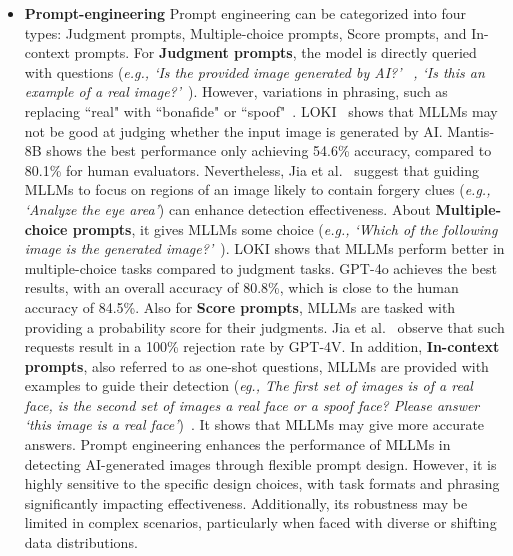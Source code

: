 \begin{itemize}
\item \textbf{Prompt-engineering}
Prompt engineering can be categorized into four types: Judgment prompts, Multiple-choice prompts, Score prompts, and In-context prompts. 
For \textbf{Judgment prompts}, the model is directly queried with questions (\textit{e.g., `Is the provided image generated by AI?'}~\cite{ye2024loki} \textit{, `Is this an example of a real image?'}~\cite{shi2024shield, huang2024visualcritic}). However, variations in phrasing, such as replacing ``real" with ``bonafide" or ``spoof"~\cite{shi2024shield}. LOKI~\cite{ye2024loki} shows that MLLMs may not be good at judging whether the input image is generated by AI. Mantis-8B shows the best performance only achieving 54.6\% accuracy, compared to 80.1\% for human evaluators. Nevertheless, Jia et al.~\cite{jia2024can} suggest that guiding MLLMs to focus on regions of an image likely to contain forgery clues (\textit{e.g., `Analyze the eye area'}) can enhance detection effectiveness. About \textbf{Multiple-choice prompts}, it gives MLLMs some choice (\textit{e.g., `Which of the following image is the generated image?'}~\cite{ye2024loki}). LOKI shows that MLLMs perform better in multiple-choice tasks compared to judgment tasks. GPT-4o achieves the best results, with an overall accuracy of 80.8\%, which is close to the human accuracy of 84.5\%. 
Also for \textbf{Score prompts}, MLLMs are tasked with providing a probability score for their judgments. Jia et al.~\cite{jia2024can} observe that such requests result in a 100\% rejection rate by GPT-4V.
In addition, \textbf{In-context prompts}, also referred to as one-shot questions, MLLMs are provided with examples to guide their detection (\textit{eg., The first set of images is of a real face, is the second set of images a real
face or a spoof face? Please answer `this image is a real face'})~\cite{shi2024shield}. It shows that MLLMs may give more accurate answers. Prompt engineering enhances the performance of MLLMs in detecting AI-generated images through flexible prompt design. However, it is highly sensitive to the specific design choices, with task formats and phrasing significantly impacting effectiveness. Additionally, its robustness may be limited in complex scenarios, particularly when faced with diverse or shifting data distributions.


\end{itemize}
